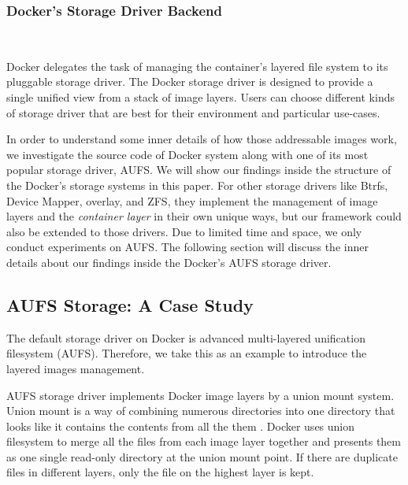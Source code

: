 
\smallbreak
\subsubsection{Docker's Storage Driver Backend}
~\smallbreak

Docker delegates the task of managing the container's layered file system to its pluggable storage driver. 
The Docker storage driver is designed to provide a single unified view from a stack of image layers.
Users can choose different kinds of storage driver that are best for their environment and particular use-cases. 

In order to understand some inner details of how those addressable images work, we investigate the source code of Docker system along with one of its most popular storage driver, AUFS. We will show our findings inside the structure of the Docker's storage systems in this paper. For other storage drivers like Btrfs, Device Mapper, overlay, and ZFS, they implement the management of image layers and the \textit{container layer} in their own unique ways, but our framework could also be extended to those drivers. Due to limited time and space, we only conduct experiments on AUFS. The following section will discuss the inner details about our findings inside the Docker's AUFS storage driver.



\subsection{AUFS Storage: A Case Study}
The default storage driver on Docker is advanced multi-layered unification filesystem (AUFS). Therefore, we take this as an example to introduce the layered images management.

AUFS storage driver implements Docker image layers by a union mount system. Union mount is a way of combining numerous directories into one directory that looks like it contains the contents from all the them \cite{aufs}. Docker uses union filesystem to merge all the files from each image layer together and presents them as one single read-only directory at the union mount point. If there are duplicate files in different layers, only the file on the highest layer is kept.

